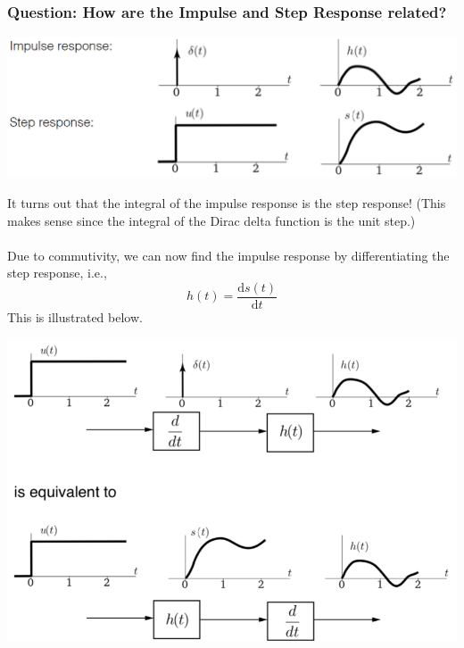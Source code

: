 \documentclass[10pt]{article}
\begin{document}
\subsubsection*{Question: How are the Impulse and Step Response related?}
\begin{center}
    \includegraphics[scale=0.5]{W4_3.png}
\end{center}
It turns out that the integral of the impulse response is the step response!  (This makes sense since the integral of the Dirac delta function is the unit step.)\\
\hrulefill\\
Due to commutivity, we can now find the impulse response by differentiating the step response, i.e.,
\[h(t) = \frac{\text{d}s(t)}{\text{d}t}\]
This is illustrated below.
\begin{center}
\includegraphics[scale=0.5]{W4_4.png}
\end{center}
\end{document}
